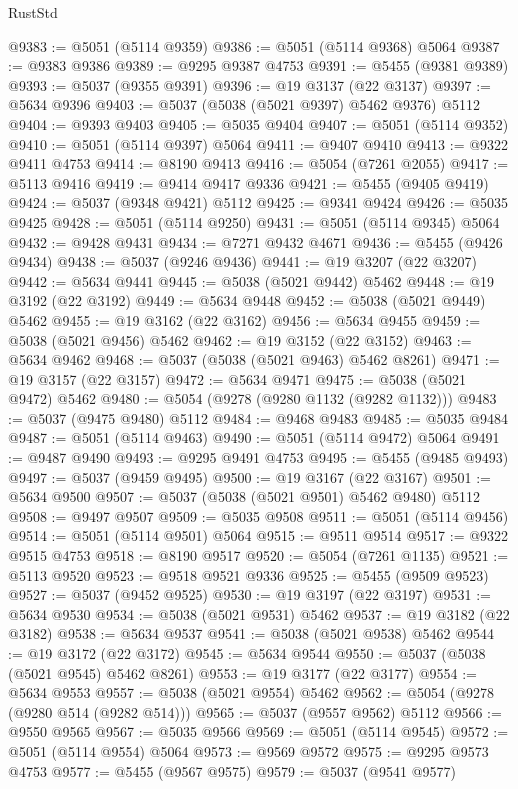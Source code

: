 \begin{lexlean}{RustStd}
\begin{coremodule}
@9383 := @5051 (@5114 @9359)
@9386 := @5051 (@5114 @9368) @5064
@9387 := @9383 @9386
@9389 := @9295 @9387 @4753
@9391 := @5455 (@9381 @9389)
@9393 := @5037 (@9355 @9391)
@9396 := @19 @3137 (@22 @3137)
@9397 := @5634 @9396
@9403 := @5037 (@5038 (@5021 @9397) @5462 @9376) @5112
@9404 := @9393 @9403
@9405 := @5035 @9404
@9407 := @5051 (@5114 @9352)
@9410 := @5051 (@5114 @9397) @5064
@9411 := @9407 @9410
@9413 := @9322 @9411 @4753
@9414 := @8190 @9413
@9416 := @5054 (@7261 @2055)
@9417 := @5113 @9416
@9419 := @9414 @9417 @9336
@9421 := @5455 (@9405 @9419)
@9424 := @5037 (@9348 @9421) @5112
@9425 := @9341 @9424
@9426 := @5035 @9425
@9428 := @5051 (@5114 @9250)
@9431 := @5051 (@5114 @9345) @5064
@9432 := @9428 @9431
@9434 := @7271 @9432 @4671
@9436 := @5455 (@9426 @9434)
@9438 := @5037 (@9246 @9436)
@9441 := @19 @3207 (@22 @3207)
@9442 := @5634 @9441
@9445 := @5038 (@5021 @9442) @5462
@9448 := @19 @3192 (@22 @3192)
@9449 := @5634 @9448
@9452 := @5038 (@5021 @9449) @5462
@9455 := @19 @3162 (@22 @3162)
@9456 := @5634 @9455
@9459 := @5038 (@5021 @9456) @5462
@9462 := @19 @3152 (@22 @3152)
@9463 := @5634 @9462
@9468 := @5037 (@5038 (@5021 @9463) @5462 @8261)
@9471 := @19 @3157 (@22 @3157)
@9472 := @5634 @9471
@9475 := @5038 (@5021 @9472) @5462
@9480 := @5054 (@9278 (@9280 @1132 (@9282 @1132)))
@9483 := @5037 (@9475 @9480) @5112
@9484 := @9468 @9483
@9485 := @5035 @9484
@9487 := @5051 (@5114 @9463)
@9490 := @5051 (@5114 @9472) @5064
@9491 := @9487 @9490
@9493 := @9295 @9491 @4753
@9495 := @5455 (@9485 @9493)
@9497 := @5037 (@9459 @9495)
@9500 := @19 @3167 (@22 @3167)
@9501 := @5634 @9500
@9507 := @5037 (@5038 (@5021 @9501) @5462 @9480) @5112
@9508 := @9497 @9507
@9509 := @5035 @9508
@9511 := @5051 (@5114 @9456)
@9514 := @5051 (@5114 @9501) @5064
@9515 := @9511 @9514
@9517 := @9322 @9515 @4753
@9518 := @8190 @9517
@9520 := @5054 (@7261 @1135)
@9521 := @5113 @9520
@9523 := @9518 @9521 @9336
@9525 := @5455 (@9509 @9523)
@9527 := @5037 (@9452 @9525)
@9530 := @19 @3197 (@22 @3197)
@9531 := @5634 @9530
@9534 := @5038 (@5021 @9531) @5462
@9537 := @19 @3182 (@22 @3182)
@9538 := @5634 @9537
@9541 := @5038 (@5021 @9538) @5462
@9544 := @19 @3172 (@22 @3172)
@9545 := @5634 @9544
@9550 := @5037 (@5038 (@5021 @9545) @5462 @8261)
@9553 := @19 @3177 (@22 @3177)
@9554 := @5634 @9553
@9557 := @5038 (@5021 @9554) @5462
@9562 := @5054 (@9278 (@9280 @514 (@9282 @514)))
@9565 := @5037 (@9557 @9562) @5112
@9566 := @9550 @9565
@9567 := @5035 @9566
@9569 := @5051 (@5114 @9545)
@9572 := @5051 (@5114 @9554) @5064
@9573 := @9569 @9572
@9575 := @9295 @9573 @4753
@9577 := @5455 (@9567 @9575)
@9579 := @5037 (@9541 @9577)

\end{coremodule}
\end{lexlean}
